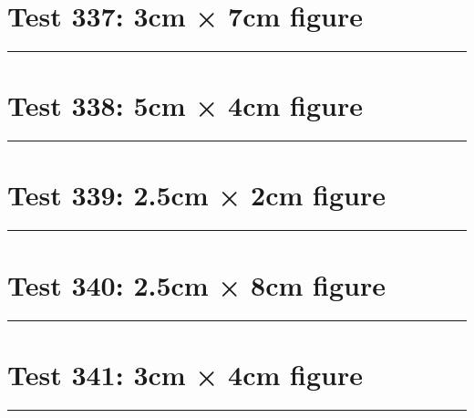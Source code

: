 \documentclass[a4paper,11pt]{article}
\begin{document}
\section*{Test 337: 3cm × 7cm figure}
\begin{swarmwrap}%
  \begin{minipage}[t]{3cm}
    \centering
    \rule{\linewidth}{7cm}
  \end{minipage}%
\end{swarmwrap}%
\swarmwrapnext
\lipsum[48]
\lipsum[49]
\lipsum[50]
\section*{Test 338: 5cm × 4cm figure}
\begin{swarmwrap}%
  \begin{minipage}[t]{5cm}
    \centering
    \rule{\linewidth}{4cm}
  \end{minipage}%
\end{swarmwrap}%
\swarmwrapnext
\lipsum[19]
\lipsum[20]
\lipsum[21]
\lipsum[22]
\lipsum[23]
\lipsum[24]
\section*{Test 339: 2.5cm × 2cm figure}
\begin{swarmwrap}%
  \begin{minipage}[t]{2cm}
    \centering
    \rule{\linewidth}{2cm}
  \end{minipage}%
\end{swarmwrap}%
\swarmwrapnext
\lipsum[137]
\lipsum[138]
\lipsum[139]
\section*{Test 340: 2.5cm × 8cm figure}
\begin{swarmwrap}%
  \begin{minipage}[t]{2cm}
    \centering
    \rule{\linewidth}{8cm}
  \end{minipage}%
\end{swarmwrap}%
\swarmwrapnext
\lipsum[118]
\lipsum[119]
\lipsum[120]
\lipsum[121]
\lipsum[122]
\lipsum[123]
\section*{Test 341: 3cm × 4cm figure}
\begin{swarmwrap}%
  \begin{minipage}[t]{3cm}
    \centering
    \rule{\linewidth}{4cm}
  \end{minipage}%
\end{swarmwrap}%
\swarmwrapnext
\lipsum[81]
\lipsum[82]
\lipsum[83]
\lipsum[84]
\lipsum[85]
\end{document}
